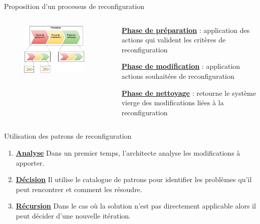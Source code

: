 \begin{frame}{Proposition d'un processus de reconfiguration}
\begin{columns}
\begin{column}{0.6\textwidth}
\begin{figure}
\centering
\includegraphics[width=0.9\textwidth]{imgs/phases-de-reconfiguration.jpg}
\end{figure}
\end{column}
\begin{column}{0.4\textwidth}
\begin{block}{}
\underline{\textbf{Phase de préparation}} : application des actions qui valident les critères de reconfiguration
\end{block}
\begin{block}{}
\underline{\textbf{Phase de modification}} : application actions souhaitées de reconfiguration
\end{block}
\begin{block}{}
\underline{\textbf{Phase de nettoyage}} : retourne le système vierge des modifications
liées à la reconfiguration
\end{block}
\end{column}
\end{columns}
\end{frame}

\begin{frame}{Utilisation des patrons de reconfiguration}
\begin{enumerate}
\setlength\itemsep{0.7cm}
\item \underline{\textbf{Analyse}} Dans un
premier temps, l'architecte analyse les modifications à apporter.
\item \underline{\textbf{Décision}}  Il utilise le catalogue de patrons pour identifier les problèmes qu'il
peut rencontrer et comment les résoudre.
\item \underline{\textbf{Récursion}} Dans le cas où la solution n'est pas directement applicable alors il
peut décider d'une nouvelle itération.
\end{enumerate}
\end{frame}

